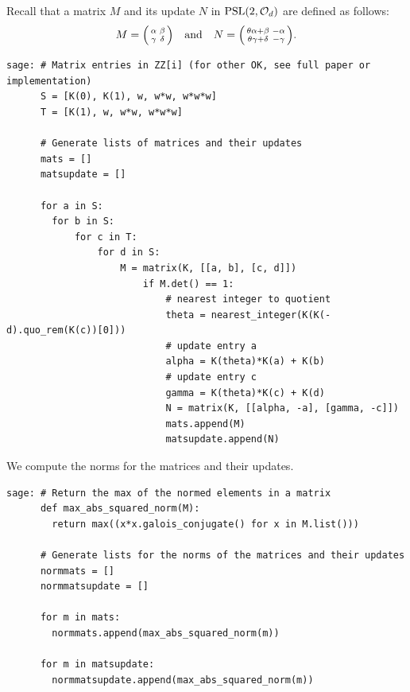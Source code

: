 \documentclass[runningheads]{llncs}
\begin{document}
Recall that a matrix \(M\) and its update \(N\) in \(\operatorname{PSL}(2,\mathcal{O}_d)\) are defined as follows:
\begin{equation*}M = \begin{psmallmatrix} \alpha & \beta \\ \gamma & \delta \end{psmallmatrix} \quad \text{and} \quad
    N =
    \begin{psmallmatrix}
    \theta \alpha + \beta & -\alpha \\ 
    \theta \gamma + \delta & - \gamma
    \end{psmallmatrix}.
\end{equation*}
\begin{lstlisting}
sage: # Matrix entries in ZZ[i] (for other OK, see full paper or implementation)
      S = [K(0), K(1), w, w*w, w*w*w]
      T = [K(1), w, w*w, w*w*w]

      # Generate lists of matrices and their updates
      mats = []
      matsupdate = []

      for a in S:
        for b in S:
            for c in T: 
                for d in S:
                    M = matrix(K, [[a, b], [c, d]])
                        if M.det() == 1:
                            # nearest integer to quotient
                            theta = nearest_integer(K(K(-d).quo_rem(K(c))[0]))
                            # update entry a
                            alpha = K(theta)*K(a) + K(b)
                            # update entry c
                            gamma = K(theta)*K(c) + K(d)
                            N = matrix(K, [[alpha, -a], [gamma, -c]])                        
                            mats.append(M)                 
                            matsupdate.append(N)
\end{lstlisting}

We compute the norms for the matrices and their updates.
\begin{lstlisting}
sage: # Return the max of the normed elements in a matrix
      def max_abs_squared_norm(M):
        return max((x*x.galois_conjugate() for x in M.list()))

      # Generate lists for the norms of the matrices and their updates
      normmats = []
      normmatsupdate = []
      
      for m in mats:
        normmats.append(max_abs_squared_norm(m))

      for m in matsupdate:
        normmatsupdate.append(max_abs_squared_norm(m))
\end{lstlisting}
\end{document}
